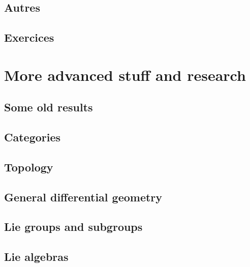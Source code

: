 \chapter{Autres}


\chapter{Exercices}



\emptyInputPath
{}

\part{More advanced stuff and research}



\chapter{Some old results}


\chapter{Categories}        \label{chap_category}


\chapter{Topology}              \label{chap_topology}



\chapter{General differential geometry} \label{Chapitre_FB}

 

\chapter{Lie groups and subgroups}


\chapter{Lie algebras}
  
 





